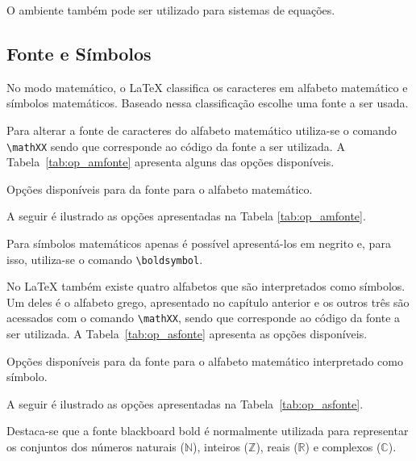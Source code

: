 O ambiente  tamb\'{e}m pode ser utilizado para sistemas de equa\c{c}\~{o}es.

\subsection{Fonte e S\'{i}mbolos}
No modo matemático, o LaTeX classifica os caracteres em alfabeto matemático e símbolos matemáticos. Baseado nessa classificação escolhe uma fonte a ser usada.

Para alterar a fonte de caracteres do alfabeto matemático utiliza-se o comando \lstinline!\mathXX! sendo que  corresponde ao código da fonte a ser utilizada. A Tabela~\ref{tab:op_amfonte} apresenta alguns das opções disponíveis.
\begin{table}[h!tb]
    \centering
    \caption{Opções disponíveis para  da fonte para o alfabeto matemático.}
    \label{tab:op_amfonte}
    
\end{table}

A seguir é ilustrado as opções apresentadas na Tabela \ref{tab:op_amfonte}. \\

Para símbolos matemáticos apenas é possível apresentá-los em negrito e, para isso, utiliza-se o comando \lstinline!\boldsymbol!. \\

No LaTeX também existe quatro alfabetos que são interpretados como símbolos. Um deles é o alfabeto grego, apresentado no capítulo anterior e os outros três são acessados com o comando \lstinline!\mathXX!, sendo que  corresponde ao código da fonte a ser utilizada. A Tabela~\ref{tab:op_asfonte} apresenta as opções disponíveis.
\begin{table}[h!tb]
    \centering
    \caption{Opções disponíveis para  da fonte para o alfabeto matemático interpretado como símbolo.}
    \label{tab:op_asfonte}
    
\end{table}

A seguir é ilustrado as opções apresentadas na Tabela~\ref{tab:op_asfonte}. \\

Destaca-se que a fonte blackboard bold é normalmente utilizada para representar os conjuntos dos números naturais ($\mathbb{N}$), inteiros ($\mathbb{Z}$), reais ($\mathbb{R}$) e complexos ($\mathbb{C}$).

